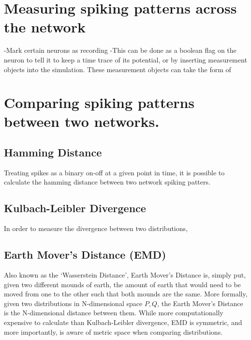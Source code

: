 \section{Measuring spiking patterns across the network}

-Mark certain neurons as recording
-This can be done as a boolean flag on the neuron to tell it to keep a time
trace of its potential, or by inserting measurement objects into the simulation.
These measurement objects can take the form of 

\section{Comparing spiking patterns between two networks.}

\subsection{Hamming Distance}
Treating spikes as a binary on-off at a given point in time, it is possible to
calculate the hamming distance between two network spiking patters. 

\subsection{Kulbach-Leibler Divergence}

In order to measure the divergence between two distributions, 

\subsection{Earth Mover's Distance (EMD)}

Also known as the `Wasserstein Distance', Earth Mover's Distance is, simply put,
given two different mounds of earth, the amount of earth that would need to be
moved from one to the other such that both mounds are the same. More formally,
given two distributions in N-dimensional space $P, Q$, the Earth Mover's
Distance is the N-dimensional distance between them. While more computationally
expensive to calculate than Kulbach-Leibler divergence, EMD is symmetric, and
more importantly, is aware of metric space when comparing distributions.

